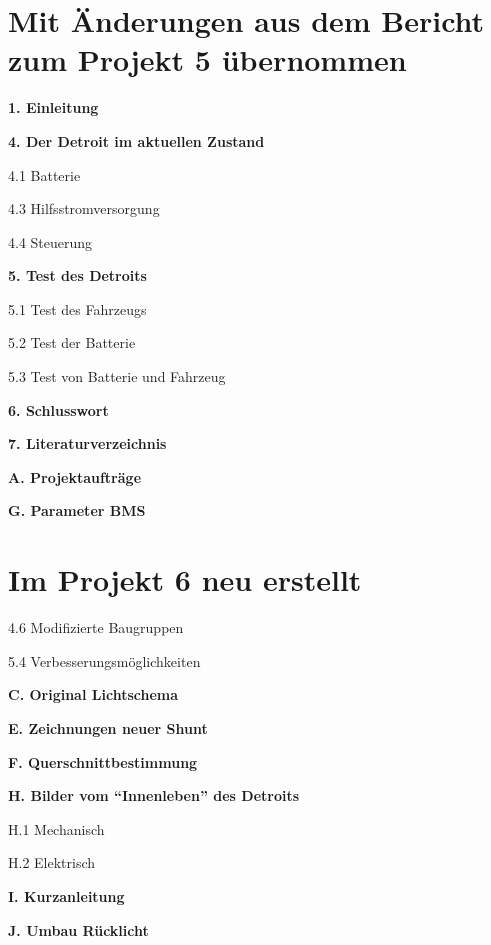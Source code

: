 \section*{Mit Änderungen aus dem Bericht zum Projekt 5 übernommen}
\begin{compactitem}
\item \textbf{1. Einleitung}
\item \textbf{4. Der Detroit im aktuellen Zustand}
\item 4.1 Batterie
\item 4.3 Hilfsstromversorgung
\item 4.4 Steuerung
\item \textbf{5. Test des Detroits}
\item 5.1 Test des Fahrzeugs
\item 5.2 Test der Batterie
\item 5.3 Test von Batterie und Fahrzeug
\item \textbf{6. Schlusswort}
\item \textbf{7. Literaturverzeichnis}
\item \textbf{A. Projektaufträge}
\item \textbf{G. Parameter BMS}
\end{compactitem}

\section*{Im Projekt 6 neu erstellt}
\begin{compactitem}
\item 4.6 Modifizierte Baugruppen
\item 5.4 Verbesserungsmöglichkeiten
\item \textbf{C. Original Lichtschema}
\item \textbf{E. Zeichnungen neuer Shunt}
\item \textbf{F. Querschnittbestimmung}
\item \textbf{H. Bilder vom "`Innenleben"' des Detroits}
\item H.1 Mechanisch
\item H.2 Elektrisch
\item \textbf{I. Kurzanleitung}
\item \textbf{J. Umbau Rücklicht}
\end{compactitem}